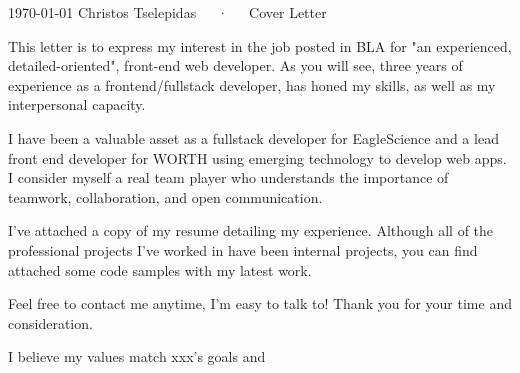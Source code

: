 \documentclass[11pt, a4paper]{awesome-cv}
\begin{document}
\makecvheader[C]

\makecvfooter
  {\today}
  {Christos Tselepidas~~~·~~~Cover Letter}
  {}

\makelettertitle

\begin{cvletter}

This letter is to express my interest in the job posted in BLA for "an experienced, detailed-oriented", front-end web developer. As you will see, three years of experience as a frontend/fullstack developer, has honed my  skills, as well as my interpersonal capacity.

\vspace{3.5mm}

I have been a valuable asset as a fullstack developer for EagleScience and a lead front end developer for WORTH using emerging technology to develop web apps. I consider myself a real team player who understands the importance of teamwork, collaboration, and open communication.

I’ve attached a copy of my resume detailing my experience. Although all of the professional projects I've worked in have been internal projects, you can find attached some code samples with my latest work.

Feel free to contact me anytime, I'm easy to talk to! 
Thank you for your time and consideration.

I believe my values match xxx's goals and

\end{cvletter}


\makeletterclosing
\end{document}
